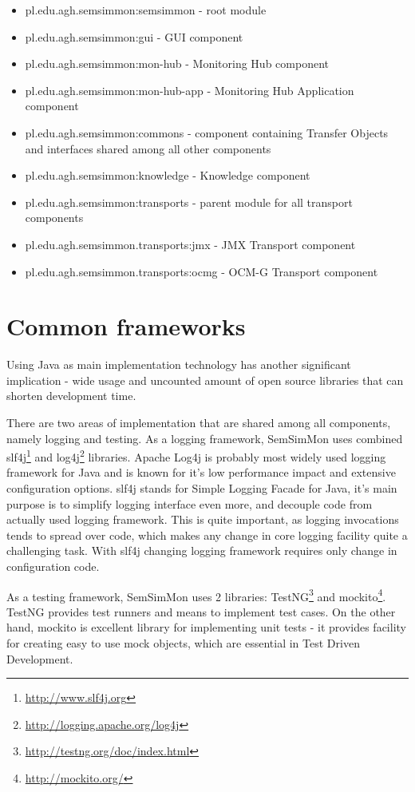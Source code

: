 \begin{itemize}
 \item pl.edu.agh.semsimmon:semsimmon - root module
 \item pl.edu.agh.semsimmon:gui - GUI component
 \item pl.edu.agh.semsimmon:mon-hub - Monitoring Hub component
 \item pl.edu.agh.semsimmon:mon-hub-app - Monitoring Hub Application component 
 \item pl.edu.agh.semsimmon:commons - component containing Transfer Objects and interfaces shared among all other
components
 \item pl.edu.agh.semsimmon:knowledge - Knowledge component
 \item pl.edu.agh.semsimmon:transports - parent module for all transport components
 \item pl.edu.agh.semsimmon.transports:jmx - JMX Transport component
 \item pl.edu.agh.semsimmon.transports:ocmg - OCM-G Transport component
\end{itemize}


\section{Common frameworks}

Using Java as main implementation technology has another significant implication - wide usage and uncounted amount of
open source libraries that can shorten development time.

There are two areas of implementation that are shared among all components, namely logging and testing. As a logging
framework, SemSimMon uses combined slf4j\footnote{\url{http://www.slf4j.org}} and
log4j\footnote{\url{http://logging.apache.org/log4j}} libraries. Apache Log4j is probably most widely used logging
framework for Java and is known for it's low performance impact and extensive configuration options. slf4j stands for
Simple Logging Facade for Java, it's main purpose is to simplify logging interface even more, and decouple code from
actually used logging framework. This is quite important, as logging invocations tends to spread over code, which makes any
change in core logging facility quite a challenging task. With slf4j changing logging framework requires only change in
configuration code.

As a testing framework, SemSimMon uses 2 libraries: TestNG\footnote{\url{http://testng.org/doc/index.html}} and
mockito\footnote{\url{http://mockito.org/}}. TestNG provides test runners and means to implement test cases. On the
other hand, mockito is excellent library for implementing unit tests - it provides facility for creating easy to use
mock objects, which are essential in Test Driven Development.




